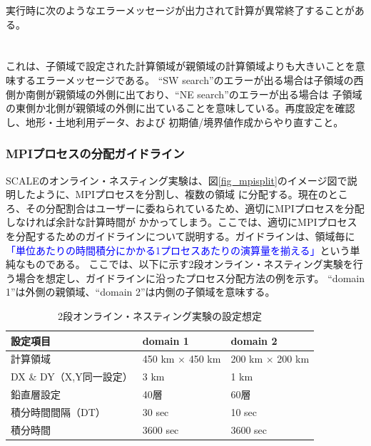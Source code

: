 実行時に次のようなエラーメッセージが出力されて計算が異常終了することがある。\\

\\

\\

\noindent これは、子領域で設定された計算領域が親領域の計算領域よりも大きいことを意味するエラーメッセージである。
``SW search''のエラーが出る場合は子領域の西側か南側が親領域の外側に出ており、``NE search''のエラーが出る場合は
子領域の東側か北側が親領域の外側に出ていることを意味している。再度設定を確認し、地形・土地利用データ、および
初期値/境界値作成からやり直すこと。


\subsubsection{MPIプロセスの分配ガイドライン}
SCALEのオンライン・ネスティング実験は、図\ref{fig_mpisplit}のイメージ図で説明したように、MPIプロセスを分割し、複数の領域
に分配する。現在のところ、その分配割合はユーザーに委ねられているため、適切にMPIプロセスを分配しなければ余計な計算時間が
かかってしまう。ここでは、適切にMPIプロセスを分配するためのガイドラインについて説明する。ガイドラインは、領域毎に
\textcolor{blue}{「単位あたりの時間積分にかかる1プロセスあたりの演算量を揃える」}という単純なものである。
ここでは、以下に示す2段オンライン・ネスティング実験を行う場合を想定し、ガイドラインに沿ったプロセス分配方法の例を示す。
``domain 1''は外側の親領域、``domain 2''は内側の子領域を意味する。

\begin{table}[htb]
\begin{center}
\caption{2段オンライン・ネスティング実験の設定想定}
\begin{tabularx}{150mm}{|l|l|X|} \hline
 \rowcolor[gray]{0.9} 設定項目 & domain 1 & domain 2 \\ \hline
 計算領域 & 450 km $\times$ 450 km & 200 km $\times$ 200 km \\ \hline
 DX \& DY（X,Y同一設定） & 3 km & 1 km \\ \hline
 鉛直層設定 & 40層 & 60層 \\ \hline
 積分時間間隔（DT）& 30 sec & 10 sec \\ \hline
 積分時間 & 3600 sec & 3600 sec \\ \hline
\end{tabularx}
\label{tab:nest_proc_guide1}
\end{center}
\end{table}

